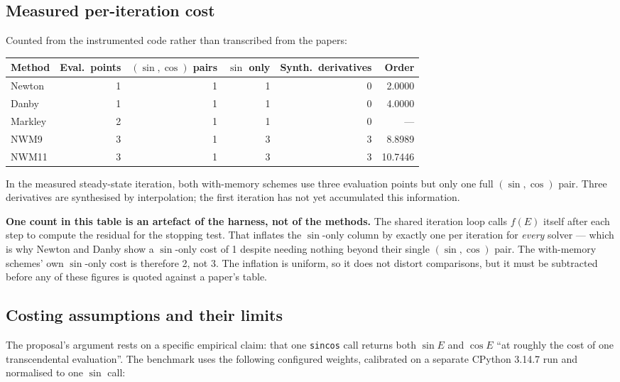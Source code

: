 \documentclass[11pt,a4paper]{article}
\begin{document}
\subsection{Measured per-iteration cost}

Counted from the instrumented code rather than transcribed from the
papers:

\begin{center}
\small
\begin{tabular}{@{}lrrrrr@{}}
\toprule
\textbf{Method} & \textbf{Eval.\ points} & \textbf{$(\sin,\cos)$ pairs} & \textbf{$\sin$ only} & \textbf{Synth.\ derivatives} & \textbf{Order} \\
\midrule
Newton  & 1 & 1 & 1 & 0 & 2.0000 \\
Danby   & 1 & 1 & 1 & 0 & 4.0000 \\
Markley & 2 & 1 & 1 & 0 & --- \\
NWM9    & 3 & 1 & 3 & 3 & 8.8989 \\
NWM11   & 3 & 1 & 3 & 3 & 10.7446 \\
\bottomrule
\end{tabular}
\end{center}

In the measured steady-state iteration, both with-memory schemes use
three evaluation points but only one full $(\sin,\cos)$ pair. Three
derivatives are synthesised by interpolation; the first iteration has
not yet accumulated this information.

\begin{note}
\textbf{One count in this table is an artefact of the harness, not of the
methods.} The shared iteration loop calls $f(E)$ itself after each step to
compute the residual for the stopping test. That inflates the
$\sin$-only column by exactly one per iteration for \emph{every} solver
--- which is why Newton and Danby show a $\sin$-only cost of 1 despite
needing nothing beyond their single $(\sin,\cos)$ pair. The with-memory
schemes' own $\sin$-only cost is therefore 2, not 3. The inflation is
uniform, so it does not distort comparisons, but it must be subtracted
before any of these figures is quoted against a paper's table.
\end{note}

\subsection{Costing assumptions and their limits}

The proposal's argument rests on a specific empirical claim: that one
\texttt{sincos} call returns both $\sin E$ and $\cos E$ ``at roughly the
cost of one transcendental evaluation''. The benchmark uses the following
configured weights, calibrated on a separate CPython 3.14.7 run and
normalised to one $\sin$ call:
\end{document}
